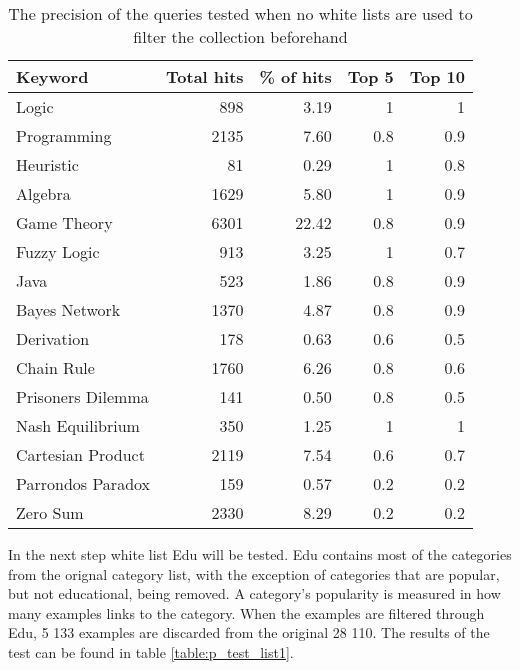 \begin{table}[H]
\centering
\begin{tabular} {|| p{10em} | r | r | r | r ||} 
 \hline
 Keyword & Total hits & \% of hits & Top 5 & Top 10 \\ [0.5ex] 
 \hline

Logic & 898 & 3.19 & 1 & 1 \\
Programming & 2135 & 7.60 & 0.8 & 0.9 \\
Heuristic & 81 & 0.29 & 1 & 0.8 \\
Algebra & 1629 & 5.80 & 1 & 0.9 \\
Game Theory & 6301 & 22.42 & 0.8 & 0.9 \\
\hline
Fuzzy Logic & 913 & 3.25 & 1 & 0.7 \\
Java & 523 & 1.86 & 0.8 & 0.9 \\
Bayes Network & 1370 & 4.87 & 0.8 & 0.9 \\
Derivation & 178 & 0.63 & 0.6 & 0.5 \\
\hline
Chain Rule & 1760 & 6.26 & 0.8 & 0.6 \\
Prisoners Dilemma & 141 & 0.50 & 0.8 & 0.5 \\
Nash Equilibrium & 350 & 1.25 & 1 & 1 \\
Cartesian Product & 2119 & 7.54 & 0.6 & 0.7 \\
Parrondos Paradox & 159 & 0.57 &  0.2 & 0.2 \\
Zero Sum & 2330 & 8.29 & 0.2 & 0.2 \\

 \hline
\end{tabular}
\caption{The precision of the queries tested when no white lists are used to filter the collection beforehand}
\label{table:p_test_no-list}
\end{table}

In the next step white list Edu will be tested. Edu contains most of the categories from the orignal category list, with the exception of categories that are popular, but not educational, being removed. A category's popularity is measured in how many examples links to the category. When the examples are filtered through Edu, 5 133 examples are discarded from the original 28 110. The results of the test can be found in table \ref{table:p_test_list1}.

